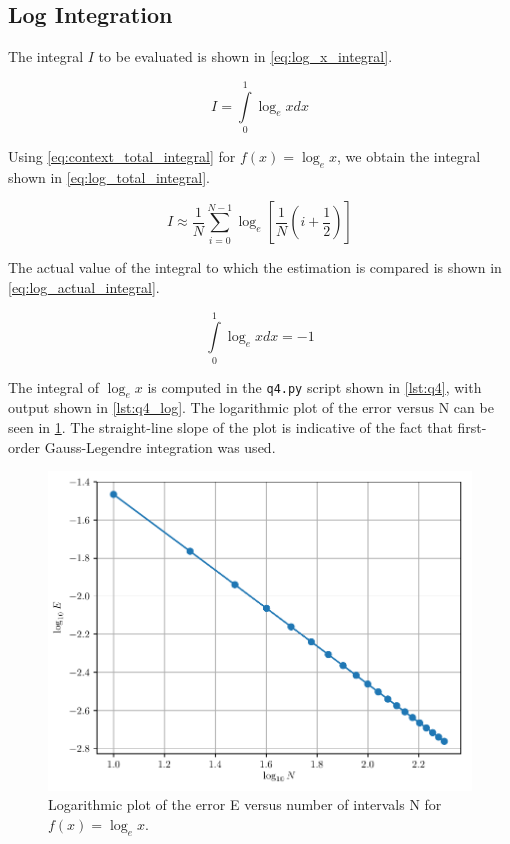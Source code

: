 \documentclass[a4paper,titlepage]{article}
\newcommand{\code}[1]{\texttt{#1}}
\begin{document}
	\subsection{Log Integration}
	
	The integral $I$ to be evaluated is shown in \cref{eq:log_x_integral}.
	
	\begin{equation} \label{eq:log_x_integral}
		I = \int\limits_{0}^{1} \log_e x dx 
	\end{equation}
	
	Using \cref{eq:context_total_integral} for $f(x) = \log_e x$, we obtain the integral shown in \cref{eq:log_total_integral}.
	
	\begin{equation} \label{eq:log_total_integral}
		I \approx \frac{1}{N} \sum_{i=0}^{N-1} \log_e \left[ \frac{1}{N} \left(i + \frac{1}{2} \right) \right]
	\end{equation}
	
	The actual value of the integral to which the estimation is compared is shown in \cref{eq:log_actual_integral}.
	
	\begin{equation} \label{eq:log_actual_integral}
		\int\limits_{0}^{1} \log_e x dx = -1
	\end{equation}
	
	The integral of $\log_e x$ is computed in the \code{q4.py} script shown in \cref{lst:q4}, with output shown in \cref{lst:q4_log}. The logarithmic plot of the error versus N can be seen in \cref{fig:q4b}. The straight-line slope of the plot is indicative of the fact that first-order Gauss-Legendre integration was used.
	
	\begin{figure}[!htb]
		\centering
		\includegraphics[width=\columnwidth]{plots/q4b.pdf}
		\caption
		{Logarithmic plot of the error E versus number of intervals N for $f(x) = \log_e x$.}
		\label{fig:q4b}
	\end{figure}
	
\end{document}
